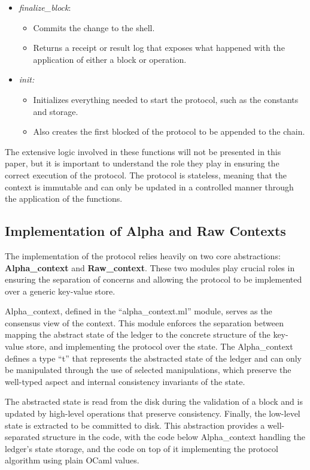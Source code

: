 \begin{itemize}
    \item \emph{finalize\_block}:
        \begin{itemize}
            \item Commits the change to the shell.
            \item Returns a receipt or result log that exposes what happened with the application of either a block or operation.
        \end{itemize}
    \item \emph{init:}
        \begin{itemize}
            \item Initializes everything needed to start the protocol, such as the constants and storage.
            \item Also creates the first blocked of the protocol to be appended to the chain.
        \end{itemize}
    \end{itemize}

The extensive logic involved in these functions will not be presented in this paper, but it is important to understand the role they play in ensuring the correct execution of the protocol. The protocol is stateless, meaning that the context is immutable and can only be updated in a controlled manner through the application of the functions.


\subsection*{Implementation of Alpha and Raw Contexts}

The implementation of the protocol relies heavily on two core abstractions: \textbf{Alpha\_context} and \textbf{Raw\_context}. These two modules play crucial roles in ensuring the separation of concerns and allowing the protocol to be implemented over a generic key-value store.

Alpha\_context, defined in the ``alpha\_context.ml'' module, serves as the consensus view of the context. This module enforces the separation between mapping the abstract state of the ledger to the concrete structure of the key-value store, and implementing the protocol over the state. The Alpha\_context defines a type ``t'' that represents the abstracted state of the ledger and can only be manipulated through the use of selected manipulations, which preserve the well-typed aspect and internal consistency invariants of the state.

The abstracted state is read from the disk during the validation of a block and is updated by high-level operations that preserve consistency. Finally, the low-level state is extracted to be committed to disk. This abstraction provides a well-separated structure in the code, with the code below Alpha\_context handling the ledger’s state storage, and the code on top of it implementing the protocol algorithm using plain OCaml values.


